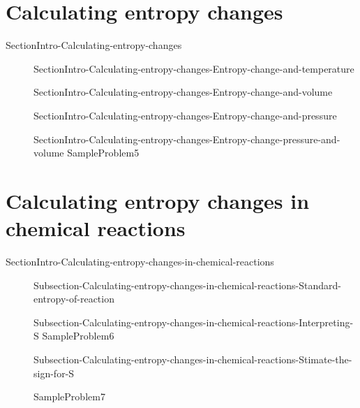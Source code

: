 \documentclass[main.tex]{subfiles}
\newcommand\chapterlabel{Ch-thermo}\setcounter{figurenewcounter}{0}\setcounter{tablenewcounter}{0}\setcounter{formulanewcounter}{0}\chapterpicture{../{\chapterlabel}/figure1}\chapterpicturelabel{PxFuel}
\begin{document}
 \section{Calculating entropy changes }
{SectionIntro-Calculating-entropy-changes}
\sloppy\begin{description}
 \item[]{SectionIntro-Calculating-entropy-changes-Entropy-change-and-temperature}
 \item[]{SectionIntro-Calculating-entropy-changes-Entropy-change-and-volume}
    \item[]{SectionIntro-Calculating-entropy-changes-Entropy-change-and-pressure} 
   \item[]{SectionIntro-Calculating-entropy-changes-Entropy-change-pressure-and-volume}
    {SampleProblem5}
   
 \end{description}
 
 
 
 \section{Calculating entropy changes in chemical reactions}{SectionIntro-Calculating-entropy-changes-in-chemical-reactions}
\sloppy\begin{description}
\item[]{Subsection-Calculating-entropy-changes-in-chemical-reactions-Standard-entropy-of-reaction}
\item[]{Subsection-Calculating-entropy-changes-in-chemical-reactions-Interpreting-S}
{SampleProblem6}
\item[]{Subsection-Calculating-entropy-changes-in-chemical-reactions-Stimate-the-sign-for-S}


{SampleProblem7}
\end{description}
\end{document}
